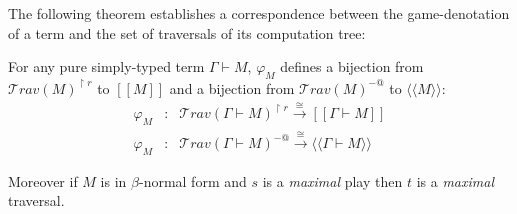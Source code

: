 \documentclass{llncs}
\newcommand\travset{\mathcal{T}rav}
\newcommand{\lsem}{[\![} %
\newcommand{\rsem}{]\!]} %
\newcommand{\sem}[1]{{\lsem #1 \rsem}}
\newcommand{\intersem}[1]{{\langle\!\langle #1 \rangle\!\rangle}}
\begin{document}
\begin{remark}
%
%
%
%
\end{remark}

The following theorem establishes a correspondence between the game-denotation of a
term and the set of traversals of its computation tree:

\begin{theorem}
\label{thm:correspondence}
 For any pure simply-typed term $\Gamma \vdash M$,
$\varphi_M$ defines a bijection from $\travset(M)^{\upharpoonright
r}$ to $\sem{M}$ and a bijection from $\travset(M)^{-@}$ to
$\intersem{M}$:
\begin{eqnarray*}
 \varphi_M  &:& \travset(\Gamma \vdash M)^{\upharpoonright r} \stackrel{\cong}{\longrightarrow} \sem{\Gamma \vdash M} \\
 \varphi_M  &:& \travset(\Gamma \vdash M)^{-@} \stackrel{\cong}{\longrightarrow} \intersem{\Gamma \vdash M}
\end{eqnarray*}

Moreover if $M$ is in $\beta$-normal form and $s$ is a
\emph{maximal} play then  $t$ is a \emph{maximal} traversal.
\end{theorem}
\end{document}
